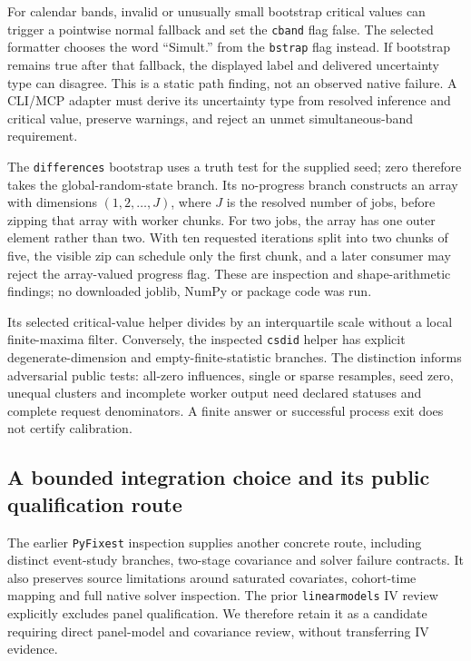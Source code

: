 For calendar bands, invalid or unusually small bootstrap critical values
can trigger a pointwise normal fallback and set the \texttt{cband} flag
false. The selected formatter chooses the word ``Simult.'' from the
\texttt{bstrap} flag instead. If bootstrap remains true after that fallback,
the displayed label and delivered uncertainty type can disagree. This is a
static path finding, not an observed native failure. A CLI/MCP adapter must
derive its uncertainty type from resolved inference and critical value,
preserve warnings, and reject an unmet simultaneous-band requirement.
\citep{exec24_panelpy_csdid,exec24_panelpy_contract}

The \texttt{differences} bootstrap uses a truth test for the supplied seed;
zero therefore takes the global-random-state branch. Its no-progress branch
constructs an array with dimensions $(1,2,\ldots,J)$, where $J$ is the
resolved number of jobs, before zipping that array with worker chunks.
For two jobs, the array has one outer element rather than two. With ten
requested iterations split into two chunks of five, the visible zip can
schedule only the first chunk, and a later consumer may reject the
array-valued progress flag. These are inspection and shape-arithmetic
findings; no downloaded joblib, NumPy or package code was run.
\citep{exec24_panelpy_differences,exec24_panelpy_contract}

Its selected critical-value helper divides by an interquartile scale without
a local finite-maxima filter. Conversely, the inspected \texttt{csdid}
helper has explicit degenerate-dimension and empty-finite-statistic branches.
The distinction informs adversarial public tests: all-zero influences,
single or sparse resamples, seed zero, unequal clusters and incomplete
worker output need declared statuses and complete request denominators.
A finite answer or successful process exit does not certify calibration.
\citep{exec24_panelpy_differences,exec24_panelpy_csdid}

\subsection{A bounded integration choice and its public qualification route}
The earlier \texttt{PyFixest} inspection supplies another concrete route,
including distinct event-study branches, two-stage covariance and solver
failure contracts. It also preserves source limitations around saturated
covariates, cohort-time mapping and full native solver inspection.
The prior \texttt{linearmodels} IV review explicitly excludes panel
qualification. We therefore retain it as a candidate requiring direct
panel-model and covariance review, without transferring IV evidence.
\citep{exec23_pyfixest_reuse_source,exec22_linearmodels_reuse}


